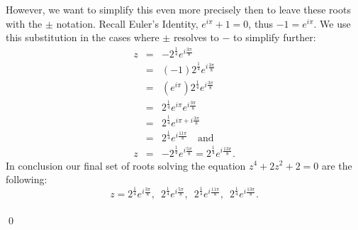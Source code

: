 \documentclass[10pt]{amsart}
\theoremstyle{nonumberplain}
\begin{document}
\begin{enumerate}[label={\bf {\arabic*}:}]
However, we want to simplify this even more precisely then to leave these roots with the $\pm$ notation.
Recall Euler's Identity, $e^{i\pi} + 1 = 0$, thus $-1 = e^{i\pi}$. We use this substitution in the cases where $\pm$ resolves to $-$ to simplify further:
\begin{eqnarray*}
z &=& -2^{\frac{1}{4}}e^{i \frac{3\pi}{8}} \\
   &=& (-1) 2^{\frac{1}{4}}e^{i \frac{3\pi}{8}} \\
   &=& (e^{i\pi}) 2^{\frac{1}{4}}e^{i \frac{3\pi}{8}} \\
   &=& 2^{\frac{1}{4}}e^{i\pi}e^{i \frac{3\pi}{8}} \\
   &=& 2^{\frac{1}{4}}e^{i\pi + i \frac{3\pi}{8}} \\
   &=& 2^{\frac{1}{4}}e^{i \frac{11\pi}{8}} \quad \text{and} \\
z &=& -2^{\frac{1}{4}}e^{i \frac{5\pi}{8}} = 2^{\frac{1}{4}}e^{i \frac{13\pi}{8}}.
\end{eqnarray*}
In conclusion our final set of roots solving the equation $z^4 + 2z^2 + 2 = 0$ are the following:
$$
z = 2^{\frac{1}{4}}e^{i \frac{3\pi}{8}}, \enspace
2^{\frac{1}{4}}e^{i \frac{5\pi}{8}}, \enspace
2^{\frac{1}{4}}e^{i \frac{11\pi}{8}}, \enspace
2^{\frac{1}{4}}e^{i \frac{13\pi}{8}}.
$$ \\
\qed \\


\end{enumerate}
\end{document}
